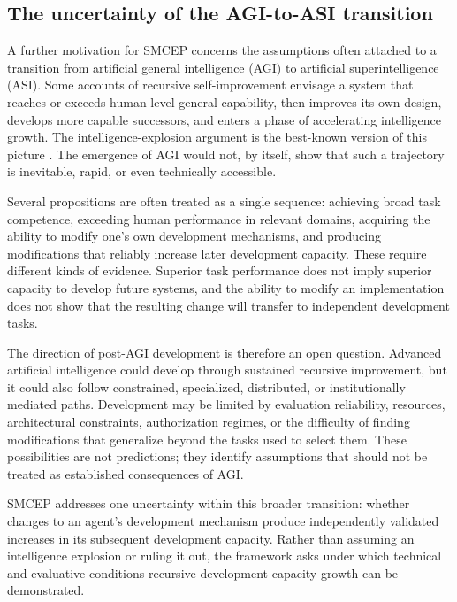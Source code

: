 \documentclass[11pt,a4paper]{article}
\begin{document}
\subsection{The uncertainty of the AGI-to-ASI transition}
A further motivation for SMCEP concerns the assumptions often attached to a transition from artificial general intelligence (AGI) to artificial superintelligence (ASI). Some accounts of recursive self-improvement envisage a system that reaches or exceeds human-level general capability, then improves its own design, develops more capable successors, and enters a phase of accelerating intelligence growth. The intelligence-explosion argument is the best-known version of this picture \cite{good1965}. The emergence of AGI would not, by itself, show that such a trajectory is inevitable, rapid, or even technically accessible.

Several propositions are often treated as a single sequence: achieving broad task competence, exceeding human performance in relevant domains, acquiring the ability to modify one's own development mechanisms, and producing modifications that reliably increase later development capacity. These require different kinds of evidence. Superior task performance does not imply superior capacity to develop future systems, and the ability to modify an implementation does not show that the resulting change will transfer to independent development tasks.

The direction of post-AGI development is therefore an open question. Advanced artificial intelligence could develop through sustained recursive improvement, but it could also follow constrained, specialized, distributed, or institutionally mediated paths. Development may be limited by evaluation reliability, resources, architectural constraints, authorization regimes, or the difficulty of finding modifications that generalize beyond the tasks used to select them. These possibilities are not predictions; they identify assumptions that should not be treated as established consequences of AGI.

SMCEP addresses one uncertainty within this broader transition: whether changes to an agent's development mechanism produce independently validated increases in its subsequent development capacity. Rather than assuming an intelligence explosion or ruling it out, the framework asks under which technical and evaluative conditions recursive development-capacity growth can be demonstrated.
\end{document}
